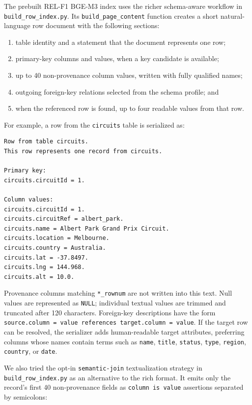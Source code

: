 \documentclass[11pt,a4paper]{article}
\newcommand{\code}[1]{\texttt{#1}}
\begin{document}
The prebuilt REL-F1 BGE-M3 index uses the richer schema-aware workflow in
\code{build\_row\_index.py}. Its \code{build\_page\_content} function creates a
short natural-language row document with the following sections:

\begin{enumerate}
  \item table identity and a statement that the document represents one row;
  \item primary-key columns and values, when a key candidate is available;
  \item up to 40 non-provenance column values, written with fully qualified names;
  \item outgoing foreign-key relations selected from the schema profile; and
  \item when the referenced row is found, up to four readable values from that row.
\end{enumerate}

For example, a row from the \code{circuits} table is serialized as:

\begin{lstlisting}[style=codestyle]
Row from table circuits.
This row represents one record from circuits.

Primary key:
circuits.circuitId = 1.

Column values:
circuits.circuitId = 1.
circuits.circuitRef = albert_park.
circuits.name = Albert Park Grand Prix Circuit.
circuits.location = Melbourne.
circuits.country = Australia.
circuits.lat = -37.8497.
circuits.lng = 144.968.
circuits.alt = 10.0.
\end{lstlisting}

Provenance columns matching \code{*\_rownum} are not written into this text.
Null values are represented as \code{NULL}; individual textual values are trimmed
and truncated after 120 characters. Foreign-key descriptions have the form
\code{source.column = value references target.column = value}. If the target row
can be resolved, the serializer adds human-readable target attributes, preferring
columns whose names contain terms such as \code{name}, \code{title},
\code{status}, \code{type}, \code{region}, \code{country}, or \code{date}.

We also tried the opt-in \code{semantic-join} textualization strategy in
\code{build\_row\_index.py} as an alternative to the rich format. It emits only the
record's first 40 non-provenance fields as \code{column is value} assertions separated
by semicolons:
\end{document}
